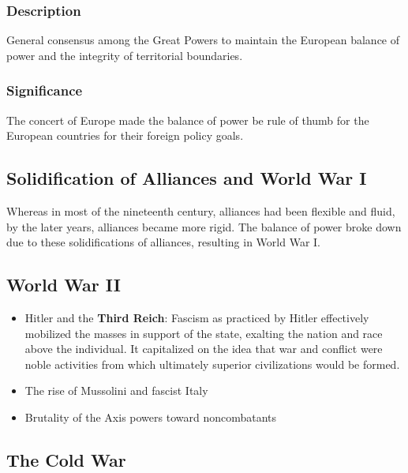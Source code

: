\documentclass[
]{book}
\begin{document}
\hypertarget{description-3}{%
\subsubsection{Description}\label{description-3}}

General consensus among the Great Powers to maintain the European balance of power and the integrity of territorial boundaries.

\hypertarget{significance-3}{%
\subsubsection{Significance}\label{significance-3}}

The concert of Europe made the balance of power be rule of thumb for the European countries for their foreign policy goals.

\hypertarget{solidification-of-alliances-and-world-war-i}{%
\subsection{Solidification of Alliances and World War I}\label{solidification-of-alliances-and-world-war-i}}

Whereas in most of the nineteenth century, alliances had been flexible and fluid, by the later years, alliances became more rigid. The balance of power broke down due to these solidifications of alliances, resulting in World War I.

\hypertarget{world-war-ii}{%
\subsection{World War II}\label{world-war-ii}}

\begin{itemize}
\item
  Hitler and the \textbf{Third Reich}: Fascism as practiced by Hitler effectively mobilized the masses in support of the state, exalting the nation and race above the individual. It capitalized on the idea that war and conflict were noble activities from which ultimately superior civilizations would be formed.
\item
  The rise of Mussolini and fascist Italy
\item
  Brutality of the Axis powers toward noncombatants
\end{itemize}

\hypertarget{the-cold-war}{%
\subsection{The Cold War}\label{the-cold-war}}
\end{document}
